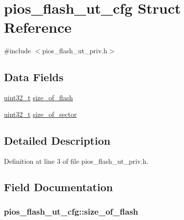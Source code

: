 \hypertarget{structpios__flash__ut__cfg}{\section{pios\-\_\-flash\-\_\-ut\-\_\-cfg Struct Reference}
\label{structpios__flash__ut__cfg}
}


{\ttfamily \#include $<$pios\-\_\-flash\-\_\-ut\-\_\-priv.\-h$>$}

\subsection*{Data Fields}
\begin{DoxyCompactItemize}
\item 
\hyperlink{stdint_8h_a435d1572bf3f880d55459d9805097f62}{uint32\-\_\-t} \hyperlink{structpios__flash__ut__cfg_a8f3cb41fec03728a72f505bfb41227c0}{size\-\_\-of\-\_\-flash}
\item 
\hyperlink{stdint_8h_a435d1572bf3f880d55459d9805097f62}{uint32\-\_\-t} \hyperlink{structpios__flash__ut__cfg_aa71a1f1da59549e862bcdbeae72174b8}{size\-\_\-of\-\_\-sector}
\end{DoxyCompactItemize}


\subsection{Detailed Description}


Definition at line 3 of file pios\-\_\-flash\-\_\-ut\-\_\-priv.\-h.



\subsection{Field Documentation}
\hypertarget{structpios__flash__ut__cfg_a8f3cb41fec03728a72f505bfb41227c0}{
\subsubsection[{size\-\_\-of\-\_\-flash}]{ pios\-\_\-flash\-\_\-ut\-\_\-cfg\-::size\-\_\-of\-\_\-flash}}\label{structpios__flash__ut__cfg_a8f3cb41fec03728a72f505bfb41227c0}


